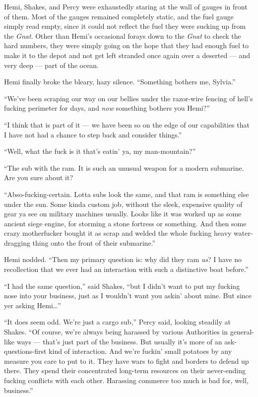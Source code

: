 \documentclass[
]{scrbook}
\begin{document}
\bigskip

Hemi, Shakes, and Percy were exhaustedly staring at the wall of gauges
in front of them. Most of the gauges remained completely static, and the
fuel gauge simply read empty, since it could not reflect the fuel they
were sucking up from the \emph{Gnat}. Other than Hemi's occasional
forays down to the \emph{Gnat} to check the hard numbers, they were
simply going on the hope that they had enough fuel to make it to the
depot and not get left stranded once again over a deserted --- and very
deep --- part of the ocean.

Hemi finally broke the bleary, hazy silence. ``Something bothers me,
Sylvia.''

``We've been scraping our way on our bellies under the razor-wire
fencing of hell's fucking perimeter for days, and \emph{now} something
bothers you Hemi?''

``I think that is part of it --- we have been so on the edge of our
capabilities that I have not had a chance to step back and consider
things.''

``Well, what the fuck is it that's eatin' ya, my man-mountain?''

``The sub with the ram. It is such an unusual weapon for a modern
submarine. Are you sure about it?

``Abso-fucking-certain. Lotta subs look the same, and that ram is
something else under the sun. Some kinda custom job, without the sleek,
expensive quality of gear ya see on military machines usually. Looks
like it was worked up as some ancient siege engine, for storming a stone
fortress or something. And then some crazy motherfucker bought it as
scrap and welded the whole fucking heavy water-dragging thing onto the
front of their submarine.''

Hemi nodded. ``Then my primary question is: why did they ram \emph{us}?
I have no recollection that we ever had an interaction with such a
distinctive boat before.''

``I had the same question,'' said Shakes, ``but I didn't want to put my
fucking nose into your business, just as I wouldn't want you askin'
about mine. But since yer asking Hemi\ldots{}''

``It does seem odd. We're just a cargo sub,'' Percy said, looking
steadily at Shakes. ``Of course, we're always being harassed by various
Authorities in general-like ways --- that's just part of the business.
But usually it's more of an ask-questions-first kind of interaction. And
we're fuckin' small potatoes by any measure you care to put to it. They
have wars to fight and borders to defend up there. They spend their
concentrated long-term resources on their never-ending fucking conflicts
with each other. Harassing commerce too much is bad for, well,
business.''
\end{document}
